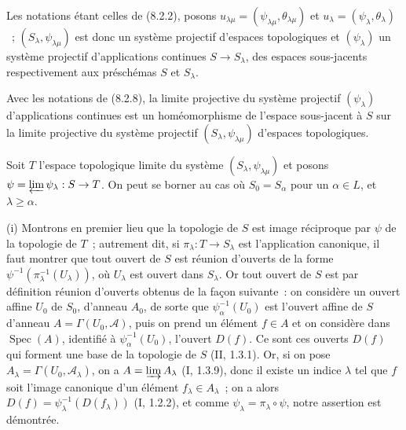 \begin{env}[8.2.8]
\label{IV.8.2.8-fr}
Les notations étant celles de (8.2.2), posons
$u_{\lambda\mu}=(\psi_{\lambda\mu},\theta_{\lambda\mu})$ et
$u_\lambda=(\psi_\lambda,\theta_\lambda)$~; $(S_\lambda,\psi_{\lambda\mu})$
est donc un système projectif d'espaces topologiques et $(\psi_\lambda)$ un
système projectif d'applications continues $S\to S_\lambda$, des espaces
sous-jacents respectivement aux préschémas $S$ et $S_\lambda$.
\end{env}

\begin{proposition}[8.2.9]
\label{IV.8.2.9-fr}
Avec les notations de (8.2.8), la limite projective du système projectif
$(\psi_\lambda)$ d'applications continues est un homéomorphisme de l'espace
sous-jacent à $S$ sur la limite projective du système projectif
$(S_\lambda,\psi_{\lambda\mu})$ d'espaces topologiques.
\end{proposition}

Soit $T$ l'espace topologique limite du système
$(S_\lambda,\psi_{\lambda\mu})$ et posons
$\psi=\varprojlim\psi_\lambda:S\to T$. On peut se borner au cas où
$S_0=S_\alpha$ pour un $\alpha\in L$, et $\lambda\geq\alpha$.

\medskip
\noindent
(i) Montrons en premier lieu que la topologie de $S$ est image réciproque par
$\psi$ de la topologie de $T$~; autrement dit, si
$\pi_\lambda:T\to S_\lambda$ est l'application canonique, il faut montrer
que tout ouvert de $S$ est réunion d'ouverts de la forme
$\psi^{-1}(\pi_\lambda^{-1}(U_\lambda))$, où $U_\lambda$ est ouvert dans
$S_\lambda$. Or tout ouvert de $S$ est par définition réunion d'ouverts
obtenus de la façon suivante~: on considère un ouvert affine $U_0$ de $S_0$,
d'anneau $A_0$, de sorte que $\psi_\alpha^{-1}(U_0)$ est l'ouvert affine de
$S$ d'anneau $A=\Gamma(U_0,\mathscr A)$, puis on prend un élément $f\in A$ et
on considère dans $\operatorname{Spec}(A)$, identifié à
$\psi_\alpha^{-1}(U_0)$, l'ouvert $D(f)$. Ce sont ces ouverts $D(f)$ qui
forment une base de la topologie de $S$ (II, 1.3.1). Or, si on pose
$A_\lambda=\Gamma(U_0,\mathscr A_\lambda)$, on a
$A=\varinjlim A_\lambda$ (I, 1.3.9), donc il existe un indice $\lambda$ tel
que $f$ soit l'image canonique d'un élément $f_\lambda\in A_\lambda$~; on a
alors $D(f)=\psi_\lambda^{-1}(D(f_\lambda))$ (I, 1.2.2), et comme
$\psi_\lambda=\pi_\lambda\circ\psi$, notre assertion est démontrée.

